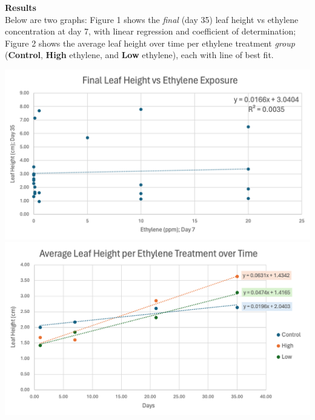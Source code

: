 \documentclass{report}
\newenvironment{minifig}
  {\noindent\minipage{\linewidth}}
  {\endminipage}
\begin{document}
\begin{multicols}{3}
  \textbf{Results}\\
  Below are two graphs: Figure 1 shows the \textit{final} (day 35) leaf height vs ethylene concentration at day 7, with linear regression and coefficient of determination; Figure 2 shows the average leaf height over time per ethylene treatment \textit{group} (\textbf{Control}, \textbf{High} ethylene, and \textbf{Low} ethylene), each with line of best fit.

  \begin{minifig}
    \medskip
    \centering
    \includegraphics[width=\linewidth]{graph2.png}
    \medskip
  \end{minifig}
  \vfill\null
  \columnbreak
  \begin{minifig}
    \medskip
    \centering
    \includegraphics[width=\linewidth]{graph1.png}
  \end{minifig}


\end{multicols}
\end{document}
